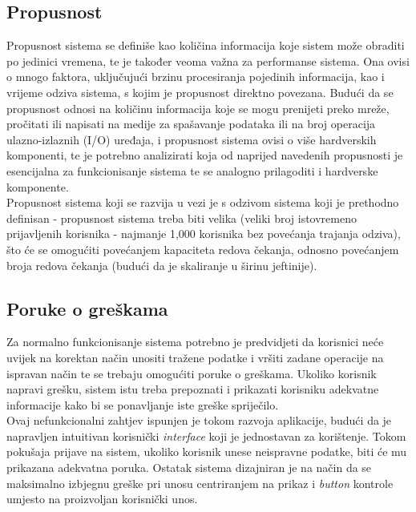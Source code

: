 \documentclass[12pt,a4paper]{article}
\begin{document}
\subsection{Propusnost}

\quad Propusnost sistema se definiše kao količina informacija koje sistem može obraditi po jedinici vremena, te je također veoma važna za performanse sistema. Ona ovisi o mnogo faktora, uključujući brzinu procesiranja pojedinih informacija, kao i vrijeme odziva sistema, s kojim je propusnost direktno povezana. Budući da se propusnost odnosi na količinu informacija koje se mogu prenijeti preko mreže, pročitati ili napisati na medije za spašavanje podataka ili na broj operacija ulazno-izlaznih (I/O) uređaja, i propusnost sistema ovisi o više hardverskih komponenti, te je potrebno analizirati koja od naprijed navedenih propusnosti je esencijalna za funkcionisanje sistema te se analogno prilagoditi i hardverske komponente. \\

Propusnost sistema koji se razvija u vezi je s odzivom sistema koji je prethodno definisan - propusnost sistema treba biti velika (veliki broj istovremeno prijavljenih korisnika - najmanje 1,000 korisnika bez povećanja trajanja odziva), što će se omogućiti povećanjem kapaciteta redova čekanja, odnosno povećanjem broja redova čekanja (budući da je skaliranje u širinu jeftinije).

\subsection{Poruke o greškama}

\quad Za normalno funkcionisanje sistema potrebno je predvidjeti da korisnici neće uvijek na korektan način unositi tražene podatke i vršiti zadane operacije na ispravan način te se trebaju omogućiti poruke o greškama. Ukoliko korisnik napravi grešku, sistem istu treba prepoznati i prikazati korisniku adekvatne informacije kako bi se ponavljanje iste greške spriječilo. \\

Ovaj nefunkcionalni zahtjev ispunjen je tokom razvoja aplikacije, budući da je napravljen intuitivan korisnički \textit{interface} koji je jednostavan za korištenje. Tokom pokušaja prijave na sistem, ukoliko korisnik unese neispravne podatke, biti će mu prikazana adekvatna poruka. Ostatak sistema dizajniran je na način da se maksimalno izbjegnu greške pri unosu centriranjem na prikaz i \textit{button} kontrole umjesto na proizvoljan korisnički unos.
\end{document}
